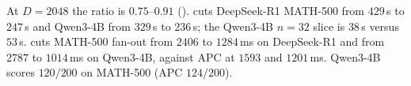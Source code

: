 At $D{=}2048$ the ratio is $0.75$--$0.91$ ().
\plus cuts DeepSeek-R1 MATH-500 from $429$\,s to $247$\,s and Qwen3-4B from $329$\,s to $236$\,s; the Qwen3-4B $n{=}32$ slice is $38$\,s versus $53$\,s.
\plus cuts MATH-500 fan-out from $2406$ to $1284$\,ms on DeepSeek-R1 and from $2787$ to $1014$\,ms on Qwen3-4B, against APC at $1593$ and $1201$\,ms.
Qwen3-4B \plus scores $120/200$ on MATH-500 (APC $124/200$).
